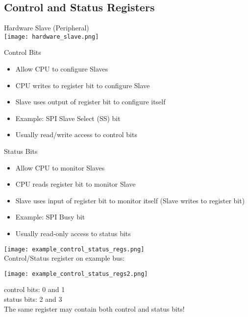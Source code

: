 \raggedcolumns
\pagebreak

\subsection{Control and Status Registers}

\begin{definition}{Hardware Slave (Peripheral)}\\
    \texttt{[image: hardware\_slave.png]}
\end{definition}


\begin{concept}{Control Bits}
    \begin{itemize}
        \item Allow CPU to configure Slaves
        \item CPU writes to register bit to configure Slave
        \item Slave uses output of register bit to configure itself
        \item Example: SPI Slave Select (SS) bit
        \item Usually read/write access to control bits
    \end{itemize}
\end{concept}

\begin{concept}{Status Bits}
    \begin{itemize}
        \item Allow CPU to monitor Slaves
        \item CPU reads register bit to monitor Slave
        \item Slave uses input of register bit to monitor itself (Slave writes to register bit)
        \item Example: SPI Busy bit
        \item Usually read-only access to status bits
    \end{itemize}
\end{concept}

\multend

\begin{example}
\texttt{[image: example\_control\_status\_regs.png]}\\
Control/Status register on example bus:

\begin{minipage}{0.5\linewidth}
\texttt{[image: example\_control\_status\_regs2.png]}
\end{minipage}
\begin{minipage}{0.4\linewidth}
control bits: 0 and 1\\
status bits: 2 and 3\\
The same register may contain both control and status bits!
\end{minipage}
\end{example}

